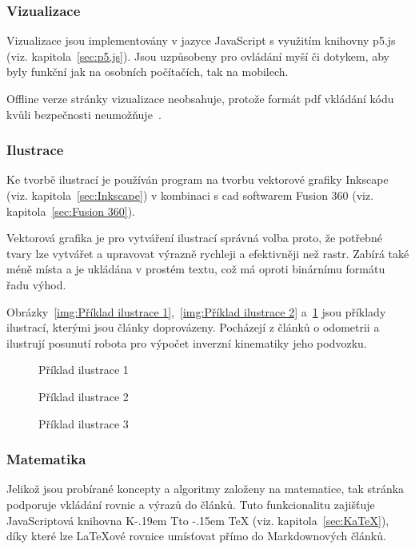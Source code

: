 \documentclass[a4paper, 12pt]{article}
\makeatletter
\newcommand*{\fullref}[1]{\hyperref[{#1}]{\ref*{#1}}}
\DeclareRobustCommand{\KaTeX}{%
  K\kern -.19em
  {\sbox \z@ T\vbox to\ht \z@ {\hbox{%
  \check@mathfonts
  \fontsize\sf@size\z@
  \selectfont A}%
  \vss}%
}\kern -.15em
\TeX}
\makeatother
\begin{document}
  \subsubsection{Vizualizace} \label{sec:Vizualizace}
  Vizualizace jsou implementovány v jazyce JavaScript s využitím knihovny p5.js (viz. kapitola~\fullref{sec:p5.js}). Jsou uzpůsobeny pro ovládání myší či dotykem, aby byly funkční jak na osobních počítačích, tak na mobilech.

  Offline verze stránky vizualizace neobsahuje, protože formát \gls{pdf} vkládání kódu kvůli bezpečnosti neumožňuje~\cite{history-of-pdf}.


  \subsubsection{Ilustrace} \label{sec:Ilustrace}
  Ke tvorbě ilustrací je používán program na tvorbu vektorové grafiky Inkscape (viz. kapitola~\fullref{sec:Inkscape}) v kombinaci s \gls{cad} softwarem Fusion 360 (viz. kapitola~\fullref{sec:Fusion 360}).

  Vektorová grafika je pro vytváření ilustrací správná volba proto, že potřebné tvary lze vytvářet a upravovat výrazně rychleji a efektivněji než rastr. Zabírá také méně místa a je ukládána v prostém textu, což má oproti binárnímu formátu řadu výhod.

  Obrázky~\ref{img:Příklad ilustrace 1},~\ref{img:Příklad ilustrace 2} a~\ref{img:Příklad ilustrace 3} jsou příklady ilustrací, kterými jsou články doprovázeny. Pocházejí z článků o odometrii a ilustrují posunutí robota pro výpočet inverzní kinematiky jeho podvozku.

  \begin{figure}[H]
      \caption{Příklad ilustrace 1} \label{img:Příklad ilustrace 1}
    \endminipage\hfill
      \caption{Příklad ilustrace 2} \label{img:Příklad ilustrace 2}
    \endminipage\hfill
      \caption{Příklad ilustrace 3} \label{img:Příklad ilustrace 3}
    \endminipage
  \end{figure}


  \subsubsection{Matematika} \label{sec:Matematika}
  Jelikož jsou probírané koncepty a algoritmy založeny na matematice, tak stránka podporuje vkládání rovnic a výrazů do článků. Tuto funkcionalitu zajišťuje JavaScriptová knihovna \KaTeX{} (viz. kapitola~\fullref{sec:KaTeX}), díky které lze \LaTeX ové rovnice umísťovat přímo do Markdownových článků.
\end{document}
